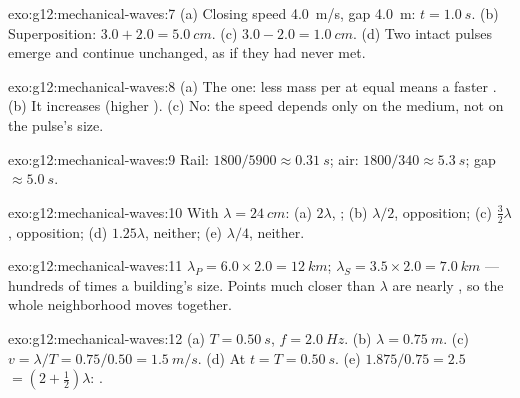 \begin{solution}{exo:g12:mechanical-waves:7}
(a) Closing speed \qty{4.0}{m/s}, gap \qty{4.0}{m}: $t = \qty{1.0}{s}$.
(b) Superposition: $3.0 + 2.0 = \qty{5.0}{cm}$.
(c) $3.0 - 2.0 = \qty{1.0}{cm}$. (d) Two intact pulses emerge and
continue unchanged, as if they had never met.
\end{solution}

\begin{solution}{exo:g12:mechanical-waves:8}
(a) The  one: less mass per  at equal  means a faster
. (b) It increases (higher ). (c) No: the speed depends
only on the medium, not on the pulse's size.
\end{solution}

\begin{solution}{exo:g12:mechanical-waves:9}
Rail: $1800/5900 \approx \qty{0.31}{s}$; air:
$1800/340 \approx \qty{5.3}{s}$; gap $\approx \qty{5.0}{s}$.
\end{solution}

\begin{solution}{exo:g12:mechanical-waves:10}
With $\lambda = \qty{24}{cm}$: (a) $2\lambda$, ;
(b) $\lambda/2$, opposition; (c) $\tfrac32\lambda$, opposition;
(d) $1.25\lambda$, neither; (e) $\lambda/4$, neither.
\end{solution}

\begin{solution}{exo:g12:mechanical-waves:11}
$\lambda_P = 6.0 \times 2.0 = \qty{12}{km}$;
$\lambda_S = 3.5 \times 2.0 = \qty{7.0}{km}$ --- hundreds of times a
building's size. Points much closer than $\lambda$ are nearly , so the whole neighborhood moves together.
\end{solution}

\begin{solution}{exo:g12:mechanical-waves:12}
(a) $T = \qty{0.50}{s}$, $f = \qty{2.0}{Hz}$.
(b) $\lambda = \qty{0.75}{m}$.
(c) $v = \lambda/T = 0.75/0.50 = \qty{1.5}{m/s}$.
(d) At $t = T = \qty{0.50}{s}$. (e) $1.875/0.75 = 2.5$ 
$= (2 + \tfrac12)\lambda$: .
\end{solution}

